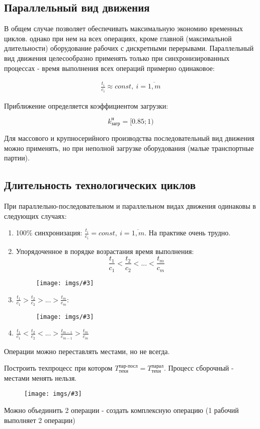 \documentclass[14pt,a4paper,oneside]{extarticle}
\newcommand{\pic}[3]{
	\begin{figure}[#1]
		\begin{center}
			\texttt{[image: imgs/\#3]}
		\end{center}
	\end{figure}
}
\begin{document}
\subsection{Параллельный вид движения} В общем случае позволяет обеспечивать максимальную экономию временных циклов. однако при нем на всех операциях, кроме главной (максимальной длительности) оборудование рабочих с дискретными перерывами. Параллельный вид движения целесообразно применять только при синхронизированных процессах - время выполнения всех операций примерно одинаковое:

\begin{gather*}
    \frac{t_i}{c_i}\approx const,\ i=\overline{1,m} 
\end{gather*}

Приближение определяется коэффициентом загрузки: 

\[k_\text{загр}^\text{н}=[0.85;1)\]

Для массового и крупносерийного производства последовательный вид движения можно применять, но при неполной загрузке оборудования (малые транспортные партии).

\subsection{Длительность технологических циклов} При параллельно-последовательном и параллельном видах движения одинаковы в следующих случаях:

\begin{enumerate}
    \item 100\% синхронизация: $\frac{t_i}{c_i}=const,\ i=\overline{1,m}$. На практике очень трудно.
    \item Упорядоченное в порядке возрастания время выполнения:
    \[\frac{t_1}{c_1}<\frac{t_2}{c_2}<...<\frac{t_m}{c_m}\]
    \pic{H}{\textwidth}{10}
    \item $\frac{t_1}{c_1}>\frac{t_2}{c_2}>...>\frac{t_m}{c_m}$:
    \pic{H}{\textwidth}{11}
    \item $\frac{t_1}{c_1}<\frac{t_2}{c_2}<...>\frac{t_{m-1}}{c_{m-1}}>\frac{t_m}{c_m}$
\end{enumerate}

Операции можно переставлять местами, но не всегда.

Построить техпроцесс при котором $T_\text{техн}^\text{пар-посл}=T_\text{техн}^\text{парал}$. Процесс сборочный - местами менять нельзя.

\pic{H}{\textwidth/2}{12}

Можно объединить 2 операции - создать комплексную операцию (1 рабочий выполняет 2 операции)
\end{document}
